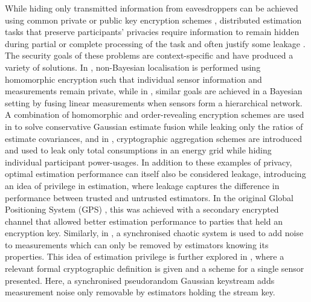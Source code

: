 \documentclass[conference]{IEEEtran}
\theoremstyle{definition}
\theoremstyle{remark}
\begin{document}
While hiding only transmitted information from eavesdroppers can be achieved using common private or public key encryption schemes \cite{katzIntroductionModernCryptography2008}, distributed estimation tasks that preserve participants' privacies require information to remain hidden during partial or complete processing of the task and often justify some leakage \cite{risticSecureFastCovariance2021,shiPrivacyPreservingAggregationTimeSeries2011}. The security goals of these problems are context-specific and have produced a variety of solutions. In \cite{alanwarPrOLocResilientLocalization2017}, non-Bayesian localisation is performed using homomorphic encryption such that individual sensor information and measurements remain private, while in \cite{aristovEncryptedMultisensorInformation2018}, similar goals are achieved in a Bayesian setting by fusing linear measurements when sensors form a hierarchical network. A combination of homomorphic and order-revealing encryption schemes are used in \cite{risticSecureFastCovariance2021} to solve conservative Gaussian estimate fusion while leaking only the ratios of estimate covariances, and in \cite{shiPrivacyPreservingAggregationTimeSeries2011,joyeScalableSchemePrivacyPreserving2013}, cryptographic aggregation schemes are introduced and used to leak only total consumptions in an energy grid while hiding individual participant power-usages. In addition to these examples of privacy, optimal estimation performance can itself also be considered leakage, introducing an idea of privilege in estimation, where leakage captures the difference in performance between trusted and untrusted estimators. In the original Global Positioning System (GPS) \cite{grovesPrinciplesGNSSInertial2015}, this was achieved with a secondary encrypted channel that allowed better estimation performance to parties that held an encryption key. Similarly, in \cite{murguiaInformationTheoreticPrivacyChaos2020}, a synchronised chaotic system is used to add noise to measurements which can only be removed by estimators knowing its properties. This idea of estimation privilege is further explored in \cite{risticCryptographicallyPrivilegedState2022}, where a relevant formal cryptographic definition is given and a scheme for a single sensor presented. Here, a synchronised pseudorandom Gaussian keystream adds measurement noise only removable by estimators holding the stream key.
\end{document}
